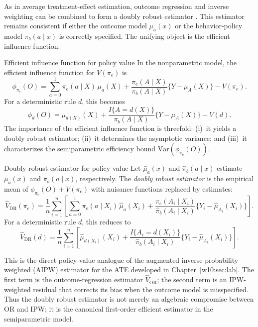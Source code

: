 \documentclass[master.tex]{subfiles}
\begin{document}
As in average treatment-effect estimation, outcome regression and inverse weighting can be combined to form a doubly robust estimator \citep{robins1994estimation,bang2005doubly,dudik2014doubly}.  This estimator remains consistent if either the outcome model $\mu_a(x)$ or the behavior-policy model $\pi_b(a\mid x)$ is correctly specified.  The unifying object is the efficient influence function.

\begin{thm}{Efficient influence function for policy value}
\label{w13:thm:eif}
In the nonparametric model, the efficient influence function for $V(\pi_e)$ is \citep{tsiatis2006semiparametric}
\[
\phi_{\pi_e}(O)
=
\sum_{a=0}^1\pi_e(a\mid X)\,\mu_a(X)
+
\frac{\pi_e(A\mid X)}{\pi_b(A\mid X)}
\bigl\{Y-\mu_A(X)\bigr\}
-
V(\pi_e).
\]
For a deterministic rule $d$, this becomes
\[
\phi_d(O)
=
\mu_{d(X)}(X)
+
\frac{I\{A=d(X)\}}{\pi_b(A\mid X)}
\bigl\{Y-\mu_A(X)\bigr\}
-
V(d).
\]
The importance of the efficient influence function is threefold: (i)~it yields a doubly robust estimator; (ii)~it determines the asymptotic variance; and (iii)~it characterizes the semiparametric efficiency bound $\mathrm{Var}(\phi_{\pi_e}(O))$.
\end{thm}

\begin{defn}{Doubly robust estimator for policy value}
\label{w13:defn:dr-est}
Let $\hat\mu_a(x)$ and $\hat\pi_b(a\mid x)$ estimate $\mu_a(x)$ and $\pi_b(a\mid x)$, respectively.  The \emph{doubly robust estimator} is the empirical mean of $\phi_{\pi_e}(O)+V(\pi_e)$ with nuisance functions replaced by estimates:
\[
\hat V_{\mathrm{DR}}(\pi_e)
=
\frac{1}{n}\sum_{i=1}^n
\left[
\sum_{a=0}^1\pi_e(a\mid X_i)\,\hat\mu_a(X_i)
+
\frac{\pi_e(A_i\mid X_i)}{\hat\pi_b(A_i\mid X_i)}
\bigl\{Y_i-\hat\mu_{A_i}(X_i)\bigr\}
\right].
\]
For a deterministic rule $d$, this reduces to
\[
\hat V_{\mathrm{DR}}(d)
=
\frac{1}{n}\sum_{i=1}^n
\left[
\hat\mu_{d(X_i)}(X_i)
+
\frac{I\{A_i=d(X_i)\}}{\hat\pi_b(A_i\mid X_i)}
\bigl\{Y_i-\hat\mu_{A_i}(X_i)\bigr\}
\right].
\]
\end{defn}

This is the direct policy-value analogue of the augmented inverse probability weighted (AIPW) estimator for the ATE developed in Chapter~\ref{w10:sec:lab}.  The first term is the outcome-regression estimator $\hat V_{\mathrm{OR}}$; the second term is an IPW-weighted residual that corrects its bias when the outcome model is misspecified.  Thus the doubly robust estimator is not merely an algebraic compromise between OR and IPW; it is the canonical first-order efficient estimator in the semiparametric model.
\end{document}
